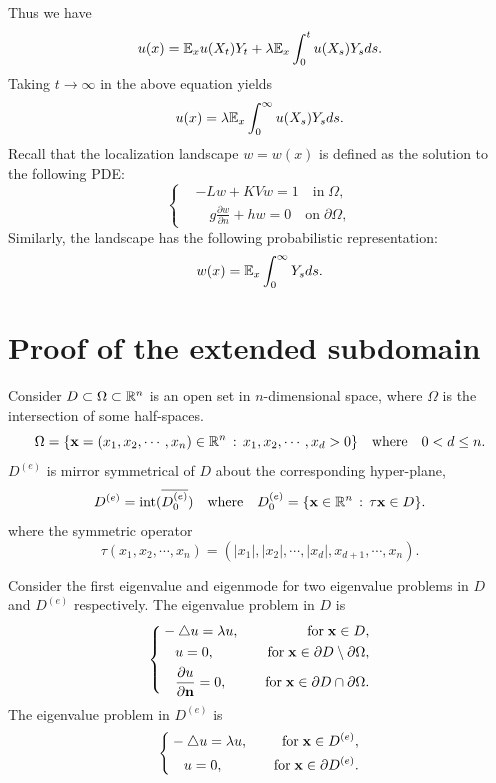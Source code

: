 \documentclass[a4paper,11pt]{article}
\begin{document}
\begin{appendices}
Thus we have
\begin{equation*}
u(x) = \mathbb{E}_xu(X_t)Y_t+\lambda\mathbb{E}_x\int_0^t u(X_s)Y_sds.
\end{equation*}
Taking $t\rightarrow\infty$ in the above equation yields
\begin{equation*}
u(x) = \lambda\mathbb{E}_x\int_0^\infty u(X_s)Y_sds.
\end{equation*}
Recall that the localization landscape $w = w(x)$ is defined as the solution to the following PDE:
\begin{equation*}
\left\{
\begin{split}
& - L w + K V w = 1 \quad \textrm{in} \; \Omega, \\
& \quad g \frac{\partial w}{\partial n} + h w = 0 \quad \textrm{on} \; \partial \Omega,
\end{split}\right.
\end{equation*}
Similarly, the landscape has the following probabilistic representation:
\begin{equation*}
w(x) = \mathbb{E}_x\int_0^\infty Y_sds.
\end{equation*}

\section{Proof of the extended subdomain}\label{appD}

Consider $D \subset \Omega \subset \mathbb{R}^n$ is an open set in $n$-dimensional space, where $\Omega$ is the intersection of some half-spaces.
$$ \Omega = \{\mathbf{x} = (x_1, x_2, \cdots, x_n) \in \mathbb{R}^n \, : \, x_1, x_2, \cdots, x_d > 0\} \quad \text{where} \quad 0 < d \leq n. $$
$D^{(e)}$ is mirror symmetrical of $D$ about the corresponding hyper-plane,
$$ D^{(e)} = \mathrm{int}(\overline{D^{(e)}_0}) \quad \text{where} \quad D^{(e)}_0 = \{\mathbf{x} \in \mathbb{R}^n \, : \, \tau \mathbf{x} \in D \}. $$
where the symmetric operator
$$ \tau (x_1, x_2, \cdots, x_n) = (|x_1|, |x_2|, \cdots, |x_d|, x_{d+1}, \cdots, x_n). $$

Consider the first eigenvalue and eigenmode for two eigenvalue problems in $D$ and $D^{(e)}$ respectively. The eigenvalue problem in $D$ is
\begin{equation}\label{eigenD}
\left\{
\begin{split}
& -\triangle u = \lambda u, & \quad \text{for} \; \mathbf{x} \in D, \\
& \quad u = 0, & \quad \text{for} \; \mathbf{x} \in \partial D \setminus \partial \Omega, \\
& \quad \frac{\partial u}{\partial \mathbf{n}} = 0, & \quad \text{for} \; \mathbf{x} \in \partial D \cap \partial \Omega.
\end{split}
\right.
\end{equation}
The eigenvalue problem in $D^{(e)}$ is
\begin{equation}\label{eigenDe}
\left\{
\begin{split}
& -\triangle u = \lambda u, & \quad \text{for} \; \mathbf{x} \in D^{(e)}, \\
& \quad u = 0, & \quad \text{for} \; \mathbf{x} \in \partial D^{(e)}.
\end{split}
\right.
\end{equation}


\end{appendices}
\end{document}
